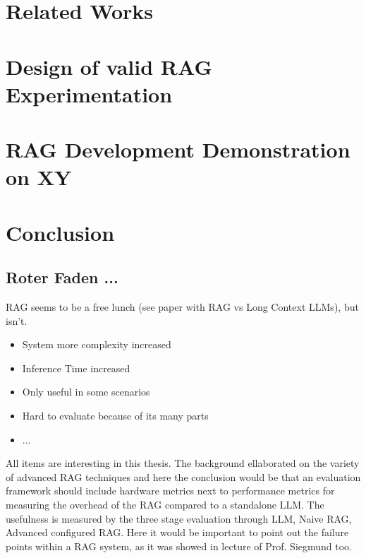 \documentclass[english,master]{swsLeipzig}
\begin{document}
\chapter{Related Works}\label{chap:relwork}


\chapter{Design of valid RAG Experimentation}\label{chap:design}


\chapter{RAG Development Demonstration on XY}\label{chap:Experiment}


\chapter{Conclusion}\label{chap:Conclusion}


\section{Roter Faden ...}
RAG seems to be a free lunch (see paper with RAG vs Long Context LLMs), but isn't. 
\begin{itemize}
  \item System more complexity increased
  \item Inference Time increased
  \item Only useful in some scenarios 
  \item Hard to evaluate because of its many parts
  \item ...
\end{itemize}

All items are interesting in this thesis. The background ellaborated on the variety of advanced RAG techniques and here the conclusion would be that an evaluation framework should include hardware metrics next to performance metrics for measuring the overhead of the RAG compared to a standalone LLM. The usefulness is measured by the three stage evaluation through LLM, Naive RAG, Advanced configured RAG. Here it would be important to point out the failure points within a RAG system, as it was showed in lecture of Prof. Siegmund too. 


\end{document}

